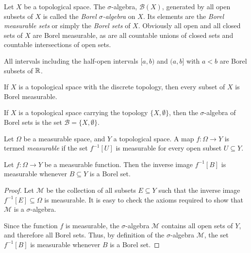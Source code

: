 \begin{example}
  Let $X$ be a topological space.  The $\sigma$-algebra, $\mathscr B (X)$, generated by all open subsets of $X$ is called the
  {\em Borel $\sigma$-algebra} on $X$. Its elements are the {\em Borel measurable sets} or simply the {\em Borel sets} of $X$.
  Obviously all open and all closed sets of $X$ are Borel measurable, as are all countable unions of closed sets and countable
  intersections of open sets.
\end{example}



\begin{example}
\begin{environmentlist}
\item All intervals including the half-open intervals $[a,b)$ and $(a,b]$ with $a<b$ are Borel subsets of $\mathbb{R}$.
\item If $X$ is a topological space with the discrete topology, then every subset of $X$ is Borel measurable.
\item If $X$ is a topological space carrying the topology $\{ X ,\emptyset \}$, then the $\sigma$-algebra
      of Borel sets is the set $\mathscr B = \{ X , \emptyset \}$.
\end{environmentlist}
\end{example}



\begin{definition}
Let $\Omega$ be a measurable space, and $Y$ a topological space.  A map $f\colon \Omega \rightarrow Y$ is termed {\em measurable} if the set $f^{-1}[U]$ is measurable for every open subset $U\subseteq Y$.
\end{definition}

\begin{proposition} \label{ime}
Let $f\colon \Omega \rightarrow Y$ be a measurable function.  Then the inverse image $f^{-1}[B]$ is measurable whenever $B\subseteq Y$ is a Borel set.
\end{proposition}

\begin{proof}
Let $\mathcal M$ be the collection of all subsets $E\subseteq Y$  such that the inverse image $f^{-1}[E] \subseteq \Omega$ is measurable.  It is easy to check the axioms required to show that $\mathcal M$ is a $\sigma$-algebra.

Since the function $f$ is measurable, the $\sigma$-algebra $\mathcal M$ contains all open sets of $Y$, and therefore all Borel sets.  Thus, by definition of the $\sigma$-algebra $\mathcal M$, the set $f^{-1}[B]$ is measurable whenever $B$ is a Borel set.
\end{proof}

